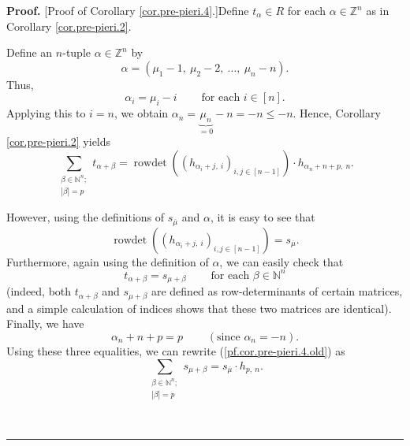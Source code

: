 \documentclass
[numbers=enddot,12pt,final,onecolumn,notitlepage,english]{scrartcl}%
\theoremstyle{definition}
\newenvironment{proof}[1][Proof]{\noindent\textbf{#1.} }{\ \rule{0.5em}{0.5em}}
\let\sumnonlimits\sum
\renewcommand{\sum}{\sumnonlimits\limits}
\newenvironment{vershort}{}{}
\begin{document}
\begin{proof}
[Proof of Corollary \ref{cor.pre-pieri.4}.]Define $t_{\alpha}\in R$ for each
$\alpha\in\mathbb{Z}^{n}$ as in Corollary \ref{cor.pre-pieri.2}.

Define an $n$-tuple $\alpha\in\mathbb{Z}^{n}$ by%
\[
\alpha=\left(  \mu_{1}-1,\ \mu_{2}-2,\ \ldots,\ \mu_{n}-n\right)  .
\]
Thus,%
\begin{equation}
\alpha_{i}=\mu_{i}-i\ \ \ \ \ \ \ \ \ \ \text{for each }i\in\left[  n\right]
. \label{pf.cor.pre-pieri.4.ali=}%
\end{equation}
Applying this to $i=n$, we obtain $\alpha_{n}=\underbrace{\mu_{n}}%
_{=0}-n=-n\leq-n$. Hence, Corollary \ref{cor.pre-pieri.2} yields
\begin{equation}
\sum_{\substack{\beta\in\mathbb{N}^{n};\\\left\vert \beta\right\vert
=p}}t_{\alpha+\beta}=\operatorname*{rowdet}\left(  \left(  h_{\alpha
_{i}+j,\ i}\right)  _{i,j\in\left[  n-1\right]  }\right)  \cdot h_{\alpha
_{n}+n+p,\ n}. \label{pf.cor.pre-pieri.4.old}%
\end{equation}


\begin{vershort}
However, using the definitions of $s_{\overline{\mu}}$ and $\alpha$, it is
easy to see that%
\[
\operatorname*{rowdet}\left(  \left(  h_{\alpha_{i}+j,\ i}\right)
_{i,j\in\left[  n-1\right]  }\right)  =s_{\overline{\mu}}.
\]
Furthermore, again using the definition of $\alpha$, we can easily check that%
\[
t_{\alpha+\beta}=s_{\mu+\beta}\ \ \ \ \ \ \ \ \ \ \text{for each }\beta
\in\mathbb{N}^{n}%
\]
(indeed, both $t_{\alpha+\beta}$ and $s_{\mu+\beta}$ are defined as
row-determinants of certain matrices, and a simple calculation of indices
shows that these two matrices are identical). Finally, we have
\[
\alpha_{n}+n+p=p\ \ \ \ \ \ \ \ \ \ \left(  \text{since }\alpha_{n}=-n\right)
.
\]
Using these three equalities, we can rewrite (\ref{pf.cor.pre-pieri.4.old}) as%
\[
\sum_{\substack{\beta\in\mathbb{N}^{n};\\\left\vert \beta\right\vert
=p}}s_{\mu+\beta}=s_{\overline{\mu}}\cdot h_{p,\ n}.
\]

\end{vershort}


\end{proof}
\end{document}
